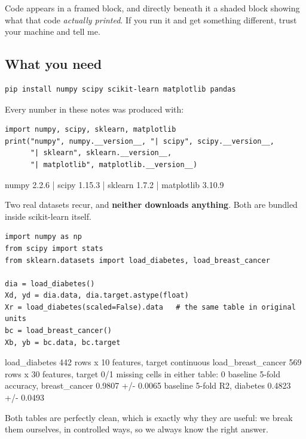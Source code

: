 \documentclass[11pt]{article}
\begin{document}
Code appears in a framed block, and directly beneath it a shaded block showing
what that code \emph{actually printed}. If you run it and get something
different, trust your machine and tell me.

\subsection{What you need}

\begin{lstlisting}
pip install numpy scipy scikit-learn matplotlib pandas
\end{lstlisting}

Every number in these notes was produced with:

\begin{lstlisting}
import numpy, scipy, sklearn, matplotlib
print("numpy", numpy.__version__, "| scipy", scipy.__version__,
      "| sklearn", sklearn.__version__,
      "| matplotlib", matplotlib.__version__)
\end{lstlisting}
\begin{codeout}
numpy 2.2.6 | scipy 1.15.3 | sklearn 1.7.2 | matplotlib 3.10.9
\end{codeout}

Two real datasets recur, and \textbf{neither downloads anything}. Both are
bundled inside scikit-learn itself.

\begin{lstlisting}
import numpy as np
from scipy import stats
from sklearn.datasets import load_diabetes, load_breast_cancer

dia = load_diabetes()
Xd, yd = dia.data, dia.target.astype(float)
Xr = load_diabetes(scaled=False).data   # the same table in original units
bc = load_breast_cancer()
Xb, yb = bc.data, bc.target
\end{lstlisting}
\begin{codeout}
load_diabetes      442 rows x 10 features, target continuous
load_breast_cancer 569 rows x 30 features, target 0/1
missing cells in either table:  0
baseline 5-fold accuracy, breast_cancer  0.9807  +/- 0.0065
baseline 5-fold R2,       diabetes       0.4823  +/- 0.0493
\end{codeout}

Both tables are perfectly clean, which is exactly why they are useful: we break
them ourselves, in controlled ways, so we always know the right answer.
\end{document}
